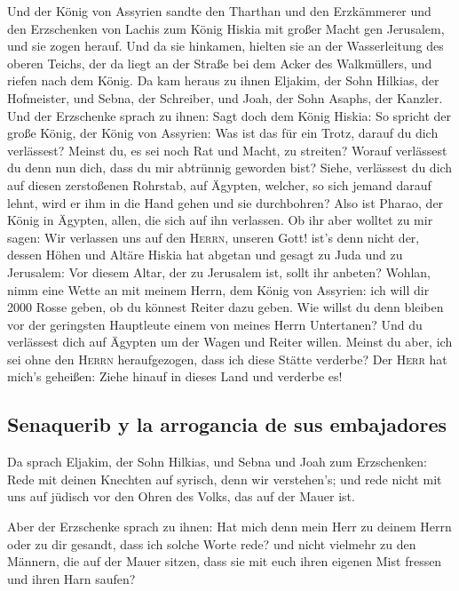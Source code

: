  Und der König von Assyrien sandte den Tharthan und den
Erzkämmerer und den Erzschenken von Lachis zum König Hiskia mit großer
Macht gen Jerusalem, und sie zogen herauf. Und da sie hinkamen, hielten
sie an der Wasserleitung des oberen Teichs, der da liegt an der Straße
bei dem Acker des Walkmüllers,  und riefen nach dem
König. Da kam heraus zu ihnen Eljakim, der Sohn Hilkias, der Hofmeister,
und Sebna, der Schreiber, und Joah, der Sohn Asaphs, der Kanzler.
 Und der Erzschenke sprach zu ihnen: Sagt doch dem König
Hiskia: So spricht der große König, der König von Assyrien: Was ist das
für ein Trotz, darauf du dich verlässest?  Meinst du, es
sei noch Rat und Macht, zu streiten? Worauf verlässest du denn nun dich,
dass du mir abtrünnig geworden bist?  Siehe, verlässest
du dich auf diesen zerstoßenen Rohrstab, auf Ägypten, welcher, so sich
jemand darauf lehnt, wird er ihm in die Hand gehen und sie durchbohren?
Also ist Pharao, der König in Ägypten, allen, die sich auf ihn
verlassen.  Ob ihr aber wolltet zu mir sagen: Wir
verlassen uns auf den \textsc{Herrn}, unseren Gott! ist's denn nicht
der, dessen Höhen und Altäre Hiskia hat abgetan und gesagt zu Juda und
zu Jerusalem: Vor diesem Altar, der zu Jerusalem ist, sollt ihr anbeten?
 Wohlan, nimm eine Wette an mit meinem Herrn, dem König
von Assyrien: ich will dir 2000 Rosse geben, ob du könnest Reiter dazu
geben.  Wie willst du denn bleiben vor der geringsten
Hauptleute einem von meines Herrn Untertanen? Und du verlässest dich auf
Ägypten um der Wagen und Reiter willen.  Meinst du aber,
ich sei ohne den \textsc{Herrn} heraufgezogen, dass ich diese Stätte
verderbe? Der \textsc{Herr} hat mich's geheißen: Ziehe hinauf in dieses
Land und verderbe es!

\hypertarget{senaquerib-y-la-arrogancia-de-sus-embajadores}{%
\subsection{Senaquerib y la arrogancia de sus
embajadores}\label{senaquerib-y-la-arrogancia-de-sus-embajadores}}

 Da sprach Eljakim, der Sohn Hilkias, und Sebna und Joah
zum Erzschenken: Rede mit deinen Knechten auf syrisch, denn wir
verstehen's; und rede nicht mit uns auf jüdisch vor den Ohren des Volks,
das auf der Mauer ist.

 Aber der Erzschenke sprach zu ihnen: Hat mich denn mein
Herr zu deinem Herrn oder zu dir gesandt, dass ich solche Worte rede?
und nicht vielmehr zu den Männern, die auf der Mauer sitzen, dass sie
mit euch ihren eigenen Mist fressen und ihren Harn saufen?

